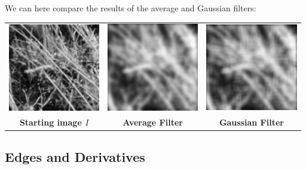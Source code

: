We can here compare the results of the average and Gaussian filters:
\begin{center}
    \footnotesize
    \begin{tabular}{c c c}
        \includegraphics[width = 4cm]{imgs/004.jpg} & \includegraphics[width = 4cm]{imgs/005.jpg} & \includegraphics[width = 4cm]{imgs/006.jpg} \\
        \textbf{Starting image $I$} & \textbf{Average Filter} & \textbf{Gaussian Filter}
    \end{tabular}
\end{center}



\subsection{Edges and Derivatives}
